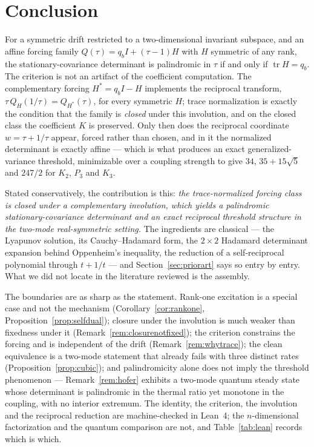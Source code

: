 \documentclass[11pt]{article}
\theoremstyle{plain}
\theoremstyle{definition}
\theoremstyle{remark}
\newcommand{\tr}{\operatorname{tr}}
\begin{document}
\section{Conclusion}\label{sec:conclusion}

For a symmetric drift restricted to a two-dimensional invariant subspace, and an affine forcing
family $Q(\tau)=q_bI+(\tau-1)H$ with $H$ symmetric of any rank, the stationary-covariance
determinant is palindromic in $\tau$ if and only if $\tr H=q_b$. The criterion is not an artifact
of the coefficient computation. The complementary forcing $H^{*}=q_bI-H$ implements the
reciprocal transform, $\tau\,Q_H(1/\tau)=Q_{H^{*}}(\tau)$, for every symmetric $H$; trace
normalization is exactly the condition that the family is \emph{closed} under this involution,
and on the closed class the coefficient $K$ is preserved. Only then does the reciprocal
coordinate $w=\tau+1/\tau$ appear, forced rather than chosen, and in it the normalized
determinant is exactly affine --- which is what produces an exact generalized-variance threshold,
minimizable over a coupling strength to give $34$, $35+15\sqrt5$ and $247/2$ for $K_2$, $P_3$ and
$K_3$.

Stated conservatively, the contribution is this: \emph{the trace-normalized forcing class is
closed under a complementary involution, which yields a palindromic stationary-covariance
determinant and an exact reciprocal threshold structure in the two-mode real-symmetric setting.}
The ingredients are classical --- the Lyapunov solution, its Cauchy--Hadamard form, the $2\times2$
Hadamard determinant expansion behind Oppenheim's inequality, the reduction of a self-reciprocal
polynomial through $t+1/t$ --- and Section~\ref{sec:priorart} says so entry by entry. What we did
not locate in the literature reviewed is the assembly.

The boundaries are as sharp as the statement. Rank-one excitation is a special case and not the
mechanism (Corollary~\ref{cor:rankone}, Proposition~\ref{prop:selfdual}); closure under the
involution is much weaker than fixedness under it (Remark~\ref{rem:closurenotfixed}); the
criterion constrains the forcing and is independent of the drift (Remark~\ref{rem:whytrace});
the clean equivalence is a two-mode statement that already fails with three distinct rates
(Proposition~\ref{prop:cubic}); and palindromicity alone does not imply the threshold phenomenon
--- Remark~\ref{rem:hofer} exhibits a two-mode quantum steady state whose determinant is
palindromic in the thermal ratio yet monotone in the coupling, with no interior extremum. The
identity, the criterion, the involution and the reciprocal reduction are machine-checked in
Lean~4; the $n$-dimensional factorization and the quantum comparison are not, and
Table~\ref{tab:lean} records which is which.
\end{document}
